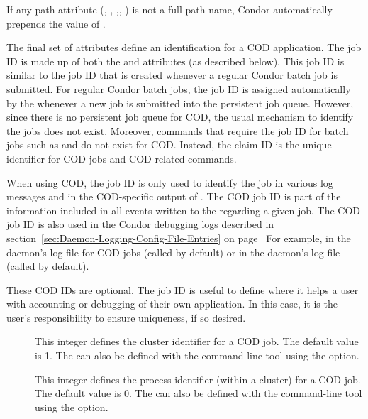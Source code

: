 \Note If any path attribute (, ,
,, ) is not a full path name,
Condor automatically prepends the value of .



The final set of attributes define an identification for a COD application.
The job ID is made up of both the  and 
attributes (as described below).
This job ID is similar to the job ID that is created whenever a
regular Condor batch job is submitted.
For regular Condor batch jobs, the job ID is assigned automatically by
the  whenever a new job is submitted into the
persistent job queue.
However, since there is no persistent job queue for COD, the usual
mechanism to identify the jobs does not exist.
Moreover, commands that require the job ID for batch jobs such as
 and  do not exist for COD.
Instead, the claim ID is the unique identifier for COD jobs and
COD-related commands.

When using COD, the job ID is only used to identify the job in various
log messages and in the COD-specific output of .
The COD job ID is part of the information included in all
events written to the 
regarding a given job.
The COD job ID is also used in the Condor debugging logs described in
section~\ref{sec:Daemon-Logging-Config-File-Entries} on
page~\pageref{sec:Daemon-Logging-Config-File-Entries}
For example, in the  daemon's log file for COD jobs
(called  by default) or in the 
daemon's log
file (called  by default).

These COD IDs are optional.
The job ID is useful to define where it helps a
user with accounting or debugging of their own application.
In this case, it is the user's responsibility to ensure uniqueness,
if so desired.
  
\begin{description}
 \item[] This integer defines the
   cluster identifier for a COD job.
   The default value is 1.
   The  can also be defined with the
    command-line tool using the 
   option.

 \item[]  This integer defines the
   process identifier (within a cluster) for a COD job.
   The default value is 0.
   The  can also be defined with the
    command-line tool using the 
   option.

\end{description}

